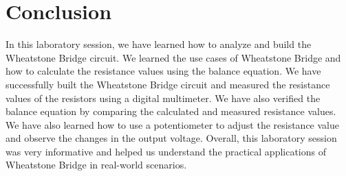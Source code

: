 \chapter{Conclusion}

In this laboratory session, we have learned how to analyze and build the Wheatstone Bridge circuit. We learned the use cases of Wheatstone Bridge and how to calculate the resistance values using the balance equation. We have successfully built the Wheatstone Bridge circuit and measured the resistance values of the resistors using a digital multimeter. We have also verified the balance equation by comparing the calculated and measured resistance values. We have also learned how to use a potentiometer to adjust the resistance value and observe the changes in the output voltage. Overall, this laboratory session was very informative and helped us understand the practical applications of Wheatstone Bridge in real-world scenarios.
